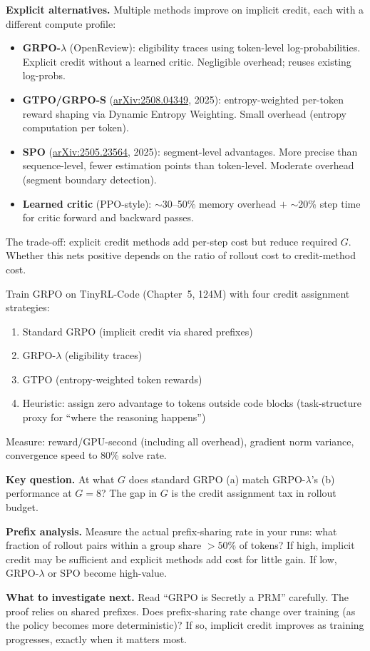 \textbf{Explicit alternatives.} Multiple methods improve on implicit credit, each with a different compute profile:
\begin{itemize}
  \item \textbf{GRPO-$\lambda$} (OpenReview): eligibility traces using token-level log-probabilities. Explicit credit without a learned critic. Negligible overhead; reuses existing log-probs.
  \item \textbf{GTPO/GRPO-S} (\href{https://arxiv.org/abs/2508.04349}{arXiv:2508.04349}, 2025): entropy-weighted per-token reward shaping via Dynamic Entropy Weighting. Small overhead (entropy computation per token).
  \item \textbf{SPO} (\href{https://arxiv.org/abs/2505.23564}{arXiv:2505.23564}, 2025): segment-level advantages. More precise than sequence-level, fewer estimation points than token-level. Moderate overhead (segment boundary detection).
  \item \textbf{Learned critic} (PPO-style): $\sim$30--50\% memory overhead $+$ $\sim$20\% step time for critic forward and backward passes.
\end{itemize}

The trade-off: explicit credit methods add per-step cost but reduce required $G$. Whether this nets positive depends on the ratio of rollout cost to credit-method cost.

\begin{exercise}

Train GRPO on TinyRL-Code (Chapter~5, 124M) with four credit assignment strategies:
\begin{enumerate}[label=(\alph*)]
  \item Standard GRPO (implicit credit via shared prefixes)
  \item GRPO-$\lambda$ (eligibility traces)
  \item GTPO (entropy-weighted token rewards)
  \item Heuristic: assign zero advantage to tokens outside code blocks (task-structure proxy for ``where the reasoning happens'')
\end{enumerate}

Measure: reward/GPU-second (including all overhead), gradient norm variance, convergence speed to 80\% solve rate.

\textbf{Key question.} At what $G$ does standard GRPO (a) match GRPO-$\lambda$'s (b) performance at $G = 8$? The gap in $G$ is the credit assignment tax in rollout budget.

\textbf{Prefix analysis.} Measure the actual prefix-sharing rate in your runs: what fraction of rollout pairs within a group share $> 50$\% of tokens? If high, implicit credit may be sufficient and explicit methods add cost for little gain. If low, GRPO-$\lambda$ or SPO become high-value.

\textbf{What to investigate next.} Read ``GRPO is Secretly a PRM'' carefully. The proof relies on shared prefixes. Does prefix-sharing rate change over training (as the policy becomes more deterministic)? If so, implicit credit improves as training progresses, exactly when it matters most.
\end{exercise}


